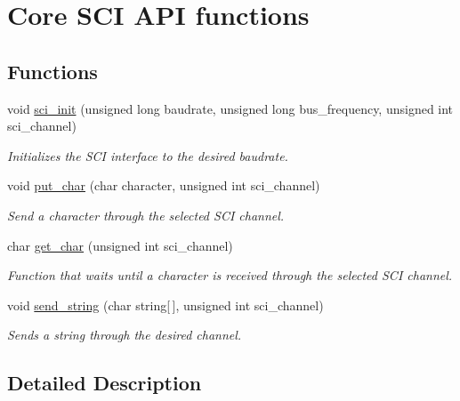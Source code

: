 \hypertarget{group___core_s_c_i}{}\section{Core S\+C\+I A\+P\+I functions}
\label{group___core_s_c_i}
\subsection*{Functions}
\begin{DoxyCompactItemize}
\item 
void \hyperlink{group___core_s_c_i_ga5064f416c84236092cef3147fe0036c1}{sci\+\_\+init} (unsigned long baudrate, unsigned long bus\+\_\+frequency, unsigned int sci\+\_\+channel)
\begin{DoxyCompactList}\small\item\em Initializes the S\+C\+I interface to the desired baudrate. \end{DoxyCompactList}\item 
void \hyperlink{group___core_s_c_i_ga487c3bdee8a71648e5133e7104f2bddf}{put\+\_\+char} (char character, unsigned int sci\+\_\+channel)
\begin{DoxyCompactList}\small\item\em Send a character through the selected S\+C\+I channel. \end{DoxyCompactList}\item 
char \hyperlink{group___core_s_c_i_ga0b72a0d9b0c7a786c00aec3b91cf0e30}{get\+\_\+char} (unsigned int sci\+\_\+channel)
\begin{DoxyCompactList}\small\item\em Function that waits until a character is received through the selected S\+C\+I channel. \end{DoxyCompactList}\item 
void \hyperlink{group___core_s_c_i_ga9df467e6c221f71bbc6080694cc5c67c}{send\+\_\+string} (char string\mbox{[}$\,$\mbox{]}, unsigned int sci\+\_\+channel)
\begin{DoxyCompactList}\small\item\em Sends a string through the desired channel. \end{DoxyCompactList}\end{DoxyCompactItemize}


\subsection{Detailed Description}


